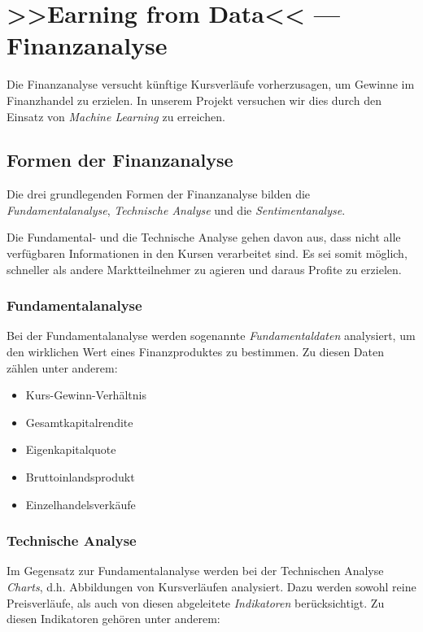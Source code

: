 \section{>>Earning from Data<< --- Finanzanalyse}
\author{Dennis Kempf, Moritz Hollenberg, Patrice Becker}

Die Finanzanalyse versucht künftige Kursverläufe vorherzusagen, um Gewinne im Finanzhandel zu erzielen. In unserem Projekt versuchen wir dies durch den Einsatz von \emph{Machine Learning} zu erreichen.

\subsection{Formen der Finanzanalyse}
\author{Dennis Kempf}

Die drei grundlegenden Formen der Finanzanalyse bilden die \emph{Fundamentalanalyse}, \emph{Technische Analyse} und die \emph{Sentimentanalyse}. 

Die Fundamental- und die Technische Analyse gehen davon aus, dass nicht alle verfügbaren Informationen in den Kursen verarbeitet sind. Es sei somit möglich, schneller als andere Marktteilnehmer zu agieren und daraus Profite zu erzielen.

\subsubsection{Fundamentalanalyse}
\author{Dennis Kempf}

Bei der Fundamentalanalyse werden sogenannte \emph{Fundamentaldaten} analysiert, um den wirklichen Wert eines Finanzproduktes zu bestimmen. Zu diesen Daten zählen unter anderem:\\ 

\begin{itemize}
	\item Kurs-Gewinn-Verhältnis
	\item Gesamtkapitalrendite
	\item Eigenkapitalquote
	\item Bruttoinlandsprodukt
	\item Einzelhandelsverkäufe
\end{itemize}

\subsubsection{Technische Analyse}
\author{Dennis Kempf}
\label{sssec:TechnischeAnalyse}

Im Gegensatz zur Fundamentalanalyse werden bei der Technischen Analyse \emph{Charts}, d.h. Abbildungen von Kursverläufen analysiert. Dazu werden sowohl reine Preisverläufe, als auch von diesen abgeleitete \emph{Indikatoren} berücksichtigt. Zu diesen Indikatoren gehören unter anderem:\\

